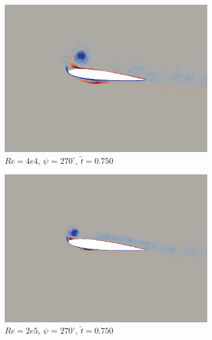 \begin{figure}[H]\ContinuedFloat
	\centering
	\begin{subfigure}[b]{0.32\textwidth}
		\centering
		\includegraphics[width=1\textwidth]{figures/Vorticity_plots/Re_40k_1pt0/phase_270.png}
		\caption{$Re=4e4$, $\psi$ = $270^\circ$, $\tilde{t}=0.750$}
		\label{fig:Re_40k_1pt0_phi270}
	\end{subfigure}
	\begin{subfigure}[b]{0.32\textwidth}
		\centering
		\includegraphics[width=1\textwidth]{figures/Vorticity_plots/Re_200k_1pt0/phase_270.png}
		\caption{$Re=2e5$, $\psi$ = $270^\circ$, $\tilde{t}=0.750$}
		\label{fig:Re_200k_1pt0_phi270}
	\end{subfigure}
	\begin{subfigure}[b]{0.32\textwidth}

\end{subfigure}
\end{figure}
